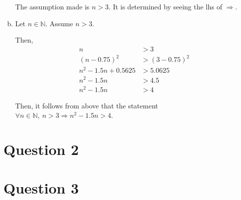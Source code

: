 \documentclass[12pt]{article}
\begin{document}
\begin{enumerate}[a.]
    The assumption made is $n > 3$. It is determined by seeing the lhs of
    $\Rightarrow$.

    \item

    Let $n \in \mathbb{N}$. Assume $n > 3$.

    \bigskip

    Then,
    \setcounter{equation}{0}
    \begin{align}
        n &> 3\\
        (n - 0.75)^2 &> (3 - 0.75)^2\\
        n^2 - 1.5n + 0.5625 &> 5.0625\\
        n^2 - 1.5n &> 4.5\\
        n^2 - 1.5n &> 4
    \end{align}

    \bigskip

    Then, it follows from above that the statement $\forall n \in \mathbb{N},\:
    n > 3 \Rightarrow n^2 - 1.5n > 4$.

\end{enumerate}

\section*{Question 2}

\section*{Question 3}
\end{document}
